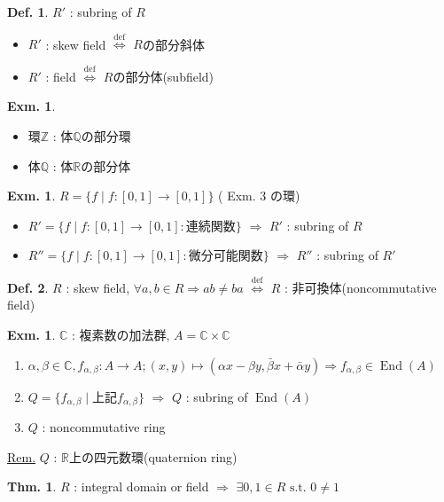 \documentclass[uplatex,dvipdfmx,9pt]{beamer}
\newcommand{\defarrow}{\overset{\mathrm{def}}{\Leftrightarrow}}
\newcommand{\st}{\text{ s.t. }}
\newcommand{\End}[1]{\operatorname{End}(#1)}
\newcommand{\Z}{\mathbb{Z}}
\newcommand{\Q}{\mathbb{Q}}
\newcommand{\R}{\mathbb{R}}
\newcommand{\C}{\mathbb{C}}
\newcounter{textExmCount}
\theoremstyle{definition} %
\newtheorem{defn}{Def.}[subsection] %
\newtheorem{thm}{Thm.}[subsection] %
\theoremstyle{example}
\newtheorem{exmText}[textExmCount]{Exm.}
\begin{document}
\begin{frame}

  \begin{defn}
    $R'$ : subring of $R$ \\
    \begin{itemize}
      \item $R'$ : skew field $\defarrow$ $R$の\alert{部分斜体}
      \item $R'$ : field $\defarrow$ $R$の\alert{部分体(subfield)}
    \end{itemize}
  \end{defn}

  \begin{exmText}
    \begin{itemize}
      \item 環$\Z$ : 体$\Q$の部分環
      \item 体$\Q$ : 体$\R$の部分体
    \end{itemize}
  \end{exmText}

  \begin{exmText}
    $R = \{f \mid f\colon [0,1] \to [0,1]\}$ ( Exm. 3 の環)
    \begin{itemize}
      \item $R' = \{f \mid f\colon [0,1] \to [0,1] : \text{連続関数}\}$ $\Rightarrow$ $R'$ : subring of $R$
      \item $R'' = \{f \mid f\colon [0,1] \to [0,1] : \text{微分可能関数}\}$ $\Rightarrow$ $R''$ : subring of $R'$
    \end{itemize}
  \end{exmText}

\end{frame}

\begin{frame}

  \begin{defn}
    $R$ : skew field, $\forall a,b \in R \Rightarrow ab \neq ba$ $\defarrow$ $R$ : \alert{非可換体(noncommutative field)}
  \end{defn}

  \begin{exmText}
    $\C$ : 複素数の加法群, $A = \C \times \C$
    \begin{enumerate}
      \item $\alpha, \beta \in \C, f_{\alpha, \beta}\colon A \to A ; (x,y) \mapsto (\alpha x - \beta y, \bar{\beta} x + \bar{\alpha} y) \Rightarrow f_{\alpha, \beta} \in \End{A}$
      \item $Q = \{f_{\alpha, \beta} \mid \text{上記$f_{\alpha, \beta}$}\}$ $\Rightarrow$ $Q$ : subring of $\End{A}$
      \item $Q$ : noncommutative ring
    \end{enumerate}
  \end{exmText}
  \underline{Rem.} $Q$ : $\R$上の\alert{四元数環(quaternion ring)}

  \begin{thm}
    $R$ : integral domain or field $\Rightarrow$ $\exists 0, 1 \in R \st 0 \neq 1$
  \end{thm}

\end{frame}
\end{document}

